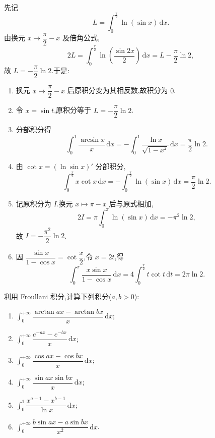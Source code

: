 \begin{solution}
  先记
  \[
    L=\int_0^{\frac{\pi}{2}}\ln(\sin x)\,\mathrm{d}x.
  \]
  由换元 $x\mapsto\dfrac{\pi}{2}-x$ 及倍角公式,
  \[
    2L=\int_0^{\frac{\pi}{2}}\ln\left(\dfrac{\sin2x}{2}\right)\,\mathrm{d}x
    =L-\dfrac{\pi}{2}\ln2,
  \]
  故 $L=-\dfrac{\pi}{2}\ln2$.于是:
  \begin{enumerate}
    \item 换元 $x\mapsto\dfrac{\pi}{2}-x$ 后原积分变为其相反数,故积分为 $0$.
    \item 令 $x=\sin t$,原积分等于 $L=-\dfrac{\pi}{2}\ln2$.
    \item 分部积分得
          \[
            \displaystyle\int_0^1\dfrac{\arcsin x}{x}\,\mathrm{d}x
            =-\int_0^1\dfrac{\ln x}{\sqrt{1-x^2}}\,\mathrm{d}x
            =\dfrac{\pi}{2}\ln2.
          \]
    \item 由 $\cot x=(\ln\sin x)'$ 分部积分,
          \[
            \displaystyle\int_0^{\frac{\pi}{2}}x\cot x\,\mathrm{d}x
            =-\int_0^{\frac{\pi}{2}}\ln(\sin x)\,\mathrm{d}x
            =\dfrac{\pi}{2}\ln2.
          \]
    \item 记原积分为 $I$.换元 $x\mapsto\pi-x$ 后与原式相加,
          \[
            2I=\pi\int_0^\pi\ln(\sin x)\,\mathrm{d}x=-\pi^2\ln2,
          \]
          故 $I=-\dfrac{\pi^2}{2}\ln2$.
    \item 因 $\dfrac{\sin x}{1-\cos x}=\cot\dfrac{x}{2}$,令 $x=2t$,得
          \[
            \displaystyle\int_0^\pi\dfrac{x\sin x}{1-\cos x}\,\mathrm{d}x
            =4\int_0^{\frac{\pi}{2}}t\cot t\,\mathrm{d}t
            =2\pi\ln2.
          \]
  \end{enumerate}
\end{solution}

\begin{example}
  利用 Froullani 积分,计算下列积分($a,b>0$):
  \begin{enumerate}
    \item $\displaystyle\int_0^{+\infty}\dfrac{\arctan ax-\arctan bx}{x}\,\mathrm{d}x$;
    \item $\displaystyle\int_0^{+\infty}\dfrac{e^{-ax}-e^{-bx}}{x}\,\mathrm{d}x$;
    \item $\displaystyle\int_0^{+\infty}\dfrac{\cos ax-\cos bx}{x}\,\mathrm{d}x$;
    \item $\displaystyle\int_0^{+\infty}\dfrac{\sin ax\sin bx}{x}\,\mathrm{d}x$;
    \item $\displaystyle\int_0^1\dfrac{x^{a-1}-x^{b-1}}{\ln x}\,\mathrm{d}x$;
    \item $\displaystyle\int_0^{+\infty}\dfrac{b\sin ax-a\sin bx}{x^2}\,\mathrm{d}x$.
  \end{enumerate}
\end{example}
\exampleblank

